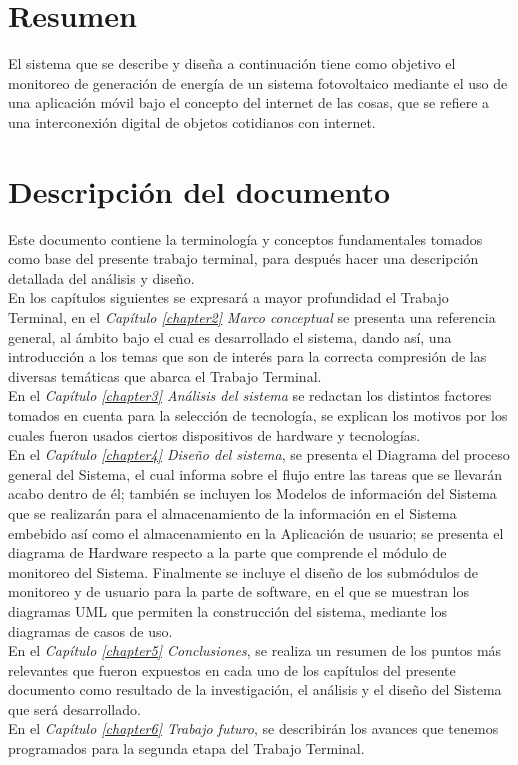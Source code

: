 \section{Resumen}
El sistema que se describe y diseña a continuación tiene como objetivo el monitoreo de generación de energía de un sistema fotovoltaico mediante el uso de una aplicación móvil bajo el concepto del internet de las cosas, que se refiere a una interconexión digital de objetos cotidianos con internet.
\section{Descripción del documento}
Este documento contiene la terminología y conceptos fundamentales tomados como base del presente trabajo terminal, para después hacer una descripción detallada del análisis y diseño. 
\\
En los capítulos siguientes se expresará a mayor profundidad el Trabajo Terminal, en el \textit{Capítulo \ref{chapter2} Marco conceptual} se presenta una referencia general, al ámbito bajo el cual es desarrollado el sistema, dando así, una introducción a los temas que son de interés para la correcta compresión de las diversas temáticas que abarca el Trabajo Terminal.
\\
En el \textit{Capítulo \ref{chapter3} Análisis del sistema} se redactan los distintos factores tomados en cuenta para la selección de tecnología, se explican los motivos por los cuales fueron usados ciertos dispositivos de hardware y tecnologías.
\\
En el \textit{Capítulo \ref{chapter4} Diseño del sistema}, se presenta el Diagrama del proceso general del Sistema, el cual informa sobre el flujo entre las tareas que se llevarán acabo dentro de él; también se incluyen los Modelos de información del Sistema que se realizarán para el almacenamiento de la información en el Sistema embebido así como el almacenamiento en la Aplicación de usuario; se presenta el diagrama de Hardware respecto a la parte que comprende el módulo de monitoreo del Sistema. Finalmente se incluye el diseño de los submódulos de monitoreo y de usuario para la parte de software, en el que se muestran los diagramas UML que permiten la construcción del sistema, mediante los diagramas de casos de uso.
\\
En el \textit{Capítulo \ref{chapter5} Conclusiones}, 
se realiza un resumen de los puntos más relevantes que fueron expuestos en cada uno de los capítulos del presente documento como resultado de la investigación, el análisis y el diseño del Sistema que será desarrollado.   
\\
En el \textit{Capítulo \ref{chapter6} Trabajo futuro}, se describirán los avances que tenemos programados para la segunda etapa del Trabajo Terminal.

